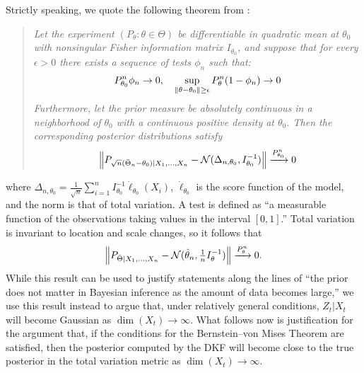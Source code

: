 Strictly speaking, we quote the following theorem from \textcite{vdV98}:
\begin{quote}
\emph{Let the experiment $(P_\theta:\theta\in\Theta)$ be differentiable in quadratic mean at $\theta_0$ with nonsingular Fisher information matrix $I_{\theta_0}$, and suppose that for every $\epsilon>0$ there exists a sequence of tests $\phi_n$ such that:}
\[
P_{\theta_0}^n\phi_n \to 0, \quad
\sup_{\left\lVert\theta-\theta_0\right\rVert\ge\epsilon} P_\theta^n(1-\phi_n) \to 0
\]
\emph{Furthermore, let the prior measure be absolutely continuous in a neighborhood of $\theta_0$ with a continuous positive density at $\theta_0$.  Then the corresponding posterior distributions satisfy}
\[
\left\lVert P_{\sqrt{n}(\bar\Theta_n-\theta_0)|X_1,\dotsc,X_n} - \mathcal{N}(\Delta_{n,\theta_0},I_{\theta_0}^{-1})\right\rVert\xrightarrow{P_{\theta_0}^n} 0
\]
\end{quote}
where $\Delta_{n,\theta_0}=\tfrac{1}{\sqrt{n}}\textstyle \sum_{i=1}^n I_{\theta_0}^{-1} \dot{\ell}_{\theta_0}(X_i)$, $\dot{\ell}_{\theta_0}$ is the score function of the model, and the norm is that of total variation.  A test is defined as ``a measurable function of the observations taking values in the interval $[0,1]$.'' Total variation is invariant to location and scale changes, so it follows that
\[
\left\lVert P_{\bar\Theta | X_1,\dotsc,X_n} - \mathcal{N}(\hat\theta_n, \tfrac{1}{n} I_\theta^{-1})\right\rVert\xrightarrow{P_\theta^n} 0.
\]
While this result can be used to justify statements along the lines of ``the prior does not matter in Bayesian inference as the amount of data becomes large,'' we use this result instead to argue that, under relatively general conditions, $Z_t|X_t$ will become Gaussian as $\dim(X_t)\rightarrow\infty$.  What follows now is justification for the argument that, if the conditions for the Bernstein--von Mises Theorem are satisfied, then the posterior computed by the DKF will become close to the true posterior in the total variation metric as $\dim(X_t)\rightarrow\infty$.

